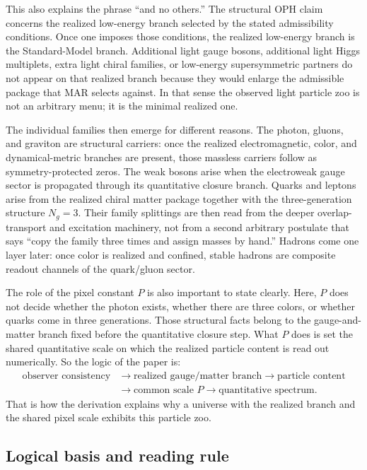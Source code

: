 \documentclass[11pt]{article}
\begin{document}
This also explains the phrase ``and no others.'' The structural OPH claim concerns the realized
low-energy branch selected by the stated admissibility conditions. Once one imposes those
conditions, the realized low-energy branch is the
Standard-Model branch. Additional light gauge bosons,
additional light Higgs multiplets, extra light chiral families, or low-energy supersymmetric
partners do not appear on that realized branch because they would enlarge the admissible package
that MAR selects against. In that sense the observed light particle zoo is not an arbitrary menu;
it is the minimal realized one.

The individual families then emerge for different reasons. The photon, gluons, and graviton are
structural carriers: once the realized electromagnetic, color, and dynamical-metric branches are
present, those massless carriers follow as symmetry-protected zeros. The weak bosons arise when
the electroweak gauge sector is propagated through its quantitative closure branch. Quarks and leptons arise from the
realized chiral matter package together with the three-generation structure \(N_g=3\). Their
family splittings are then read from the deeper overlap-transport and excitation machinery, not
from a second arbitrary postulate that says ``copy the family three times and assign masses by
hand.'' Hadrons come one layer later: once color is realized and confined, stable hadrons
are composite readout channels of the quark/gluon sector.

The role of the pixel constant \(P\) is also important to state clearly. Here, \(P\) does not
decide whether the photon exists, whether there are three colors, or whether quarks come in three
generations. Those structural facts belong to the gauge-and-matter branch fixed before the
quantitative closure step. What \(P\) does is set the shared quantitative scale on which the realized particle
content is read out numerically. So the logic of the paper is:
\[
\begin{aligned}
\text{observer consistency}
&\to
\text{realized gauge/matter branch}
\to
\text{particle content} \\
&\to
\text{common scale }P
\to
\text{quantitative spectrum}.
\end{aligned}
\]
That is how the derivation explains why a universe with the realized branch and the
shared pixel scale exhibits this particle zoo.

\subsection{Logical basis and reading rule}
\end{document}
